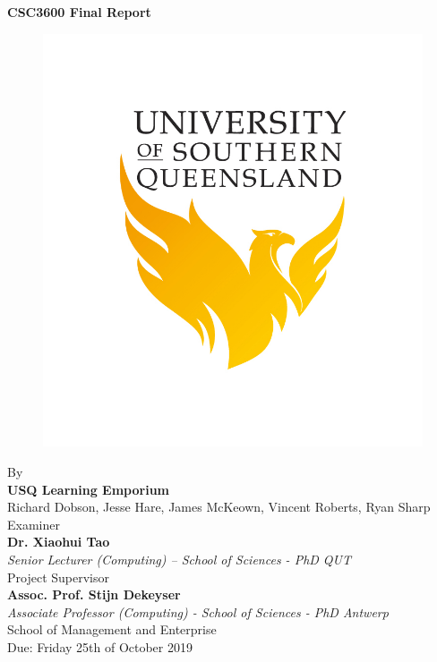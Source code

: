 \documentclass[11pt]{article}
\begin{document}

    \begin{titlepage}
        \centering
        \vspace {1cm}
        \huge{\textbf{CSC3600 Final Report}} \\ [0.1cm]
        \begin{figure}[ht!]
            \centering
            \def\svgwidth{0.5\columnwidth}
            \includegraphics[scale={0.20}]{USQ.jpg}
        \end{figure}
        \vspace {0.5cm}
        \Large{By} \\
        \Large{\textbf{USQ Learning Emporium}} \\
        \Large{Richard Dobson, Jesse Hare, James McKeown, Vincent Roberts, Ryan Sharp} \\[0.50cm]
        \Large{Examiner} \\
        \Large{\textbf{Dr. Xiaohui Tao}} \\
        \Large{\textit{Senior Lecturer (Computing) – School of Sciences -
PhD QUT}} \\[0.50cm]
        \Large{Project Supervisor} \\
        \Large{\textbf{Assoc. Prof. Stijn Dekeyser}} \\
        \Large{\textit{Associate Professor (Computing) - School of Sciences - PhD Antwerp}} \\[0.50cm]
        \Large{School of Management and Enterprise} \\[0.50cm]

        \Large{Due: Friday 25th of October 2019}
    \end{titlepage}
\end{document}
